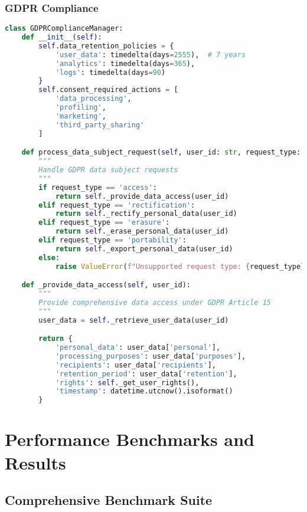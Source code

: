 \documentclass[11pt,a4paper]{article}
\begin{document}
\subsubsection{GDPR Compliance}

\begin{lstlisting}[language=Python, caption=GDPR Compliance Framework]
class GDPRComplianceManager:
    def __init__(self):
        self.data_retention_policies = {
            'user_data': timedelta(days=2555),  # 7 years
            'analytics': timedelta(days=365),
            'logs': timedelta(days=90)
        }
        self.consent_required_actions = [
            'data_processing',
            'profiling',
            'marketing',
            'third_party_sharing'
        ]

    def process_data_subject_request(self, user_id: str, request_type: str) -> dict:
        """
        Handle GDPR data subject requests
        """
        if request_type == 'access':
            return self._provide_data_access(user_id)
        elif request_type == 'rectification':
            return self._rectify_personal_data(user_id)
        elif request_type == 'erasure':
            return self._erase_personal_data(user_id)
        elif request_type == 'portability':
            return self._export_personal_data(user_id)
        else:
            raise ValueError(f"Unsupported request type: {request_type}")

    def _provide_data_access(self, user_id):
        """
        Provide comprehensive data access under GDPR Article 15
        """
        user_data = self._retrieve_user_data(user_id)

        return {
            'personal_data': user_data['personal'],
            'processing_purposes': user_data['purposes'],
            'recipients': user_data['recipients'],
            'retention_period': user_data['retention'],
            'rights': self._get_user_rights(),
            'timestamp': datetime.utcnow().isoformat()
        }
\end{lstlisting}

\section{Performance Benchmarks and Results}

\subsection{Comprehensive Benchmark Suite}
\end{document}
